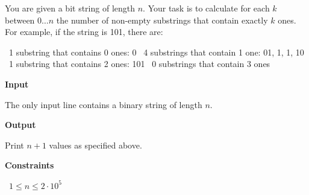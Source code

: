 You are given a bit string of length $n$. Your task is to calculate for each $k$ between $0  \ldots n$ the number of non-empty substrings that contain exactly $k$ ones.
For example, if the string is 101, there are:

\textbullet\ 1 substring that contains 0 ones: 0
\textbullet\ 4 substrings that contain 1 one: 01, 1, 1, 10
\textbullet\ 1 substring that contains 2 ones: 101
\textbullet\ 0 substrings that contain 3 ones

\vspace{0.3cm}\noindent\textbf{Input}

The only input line contains a binary string of length $n$.

\vspace{0.3cm}\noindent\textbf{Output}

Print $n+1$ values as specified above.

\vspace{0.3cm}\noindent\textbf{Constraints}

\textbullet\ $1 \le n \le 2 \cdot 10^5$